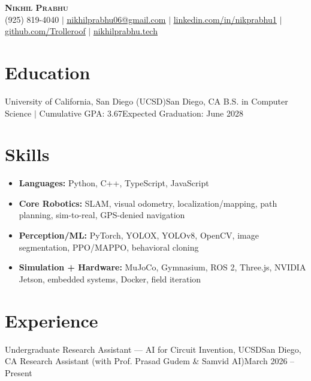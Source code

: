 




\begin{center}
    \textbf{\Large \scshape Nikhil Prabhu} \\ \vspace{1pt}
    \small (925) 819-4040 $|$ \href{mailto:nikhilprabhu06@gmail.com}{\underline{nikhilprabhu06@gmail.com}} $|$ 
    \href{https://www.linkedin.com/in/nikprabhu1/}{\underline{linkedin.com/in/nikprabhu1}} $|$
    \href{https://github.com/Trolleroof}{\underline{github.com/Trolleroof}} $|$
    \href{https://nikhilprabhu.tech}{\underline{nikhilprabhu.tech}}
\end{center}
\small

\section{Education}
  \resumeSubHeadingListStart
    \resumeSubheading
      {University of California, San Diego (UCSD)}{San Diego, CA}
      {B.S. in Computer Science $|$ Cumulative GPA: 3.67}{Expected Graduation: June 2028}
  \resumeSubHeadingListEnd
\vspace{-4pt}

\section{Skills}
\begin{itemize}[leftmargin=0.15in, label={}, nosep, topsep=2pt, itemsep=3pt, parsep=0pt]
  \item \textbf{Languages:} Python, C++, TypeScript, JavaScript
  \item \textbf{Core Robotics:} SLAM, visual odometry, localization/mapping, path planning, sim-to-real, GPS-denied navigation
  \item \textbf{Perception/ML:} PyTorch, YOLOX, YOLOv8, OpenCV, image segmentation, PPO/MAPPO, behavioral cloning
  \item \textbf{Simulation + Hardware:} MuJoCo, Gymnasium, ROS 2, Three.js, NVIDIA Jetson, embedded systems, Docker, field iteration
\end{itemize}
\vspace{-4pt}

\section{Experience}
  \resumeSubHeadingListStart

    \resumeSubheading
      {Undergraduate Research Assistant --- AI for Circuit Invention, UCSD}{San Diego, CA}
      {Research Assistant (with Prof. Prasad Gudem \& Samvid AI)}{March 2026 -- Present}
      \resumeItemListStart
      \resumeItemListEnd

